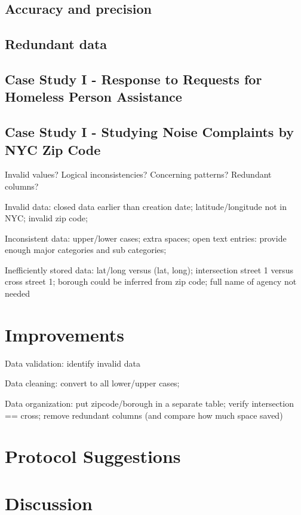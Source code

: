 \documentclass[12pt, titlepage]{article}
\begin{document}
\subsection{Accuracy and precision}

\subsection{Redundant data}

\subsection{Case Study I - Response to Requests for Homeless Person Assistance}


\subsection{Case Study I - Studying Noise Complaints by NYC Zip Code}




Invalid values?
Logical inconsistencies? Concerning patterns?
Redundant columns?

Invalid data: closed data earlier than creation date;
latitude/longitude not in NYC; invalid zip code;

Inconsistent data: upper/lower cases; extra spaces; 
open text entries: provide enough major categories and sub categories;

Inefficiently stored data: lat/long versus (lat, long);
intersection street 1 versus cross street 1;
borough could be inferred from zip code;
full name of agency not needed

\section{Improvements} \label{sec:improve}

Data validation: identify invalid data

Data cleaning: convert to all lower/upper cases;

Data organization: put zipcode/borough in a separate table; verify intersection
== cross; remove redundant columns (and compare how much space saved)

\section{Protocol Suggestions} \label{sec:protocol}

\section{Discussion} \label{sec:disc}




\end{document}
